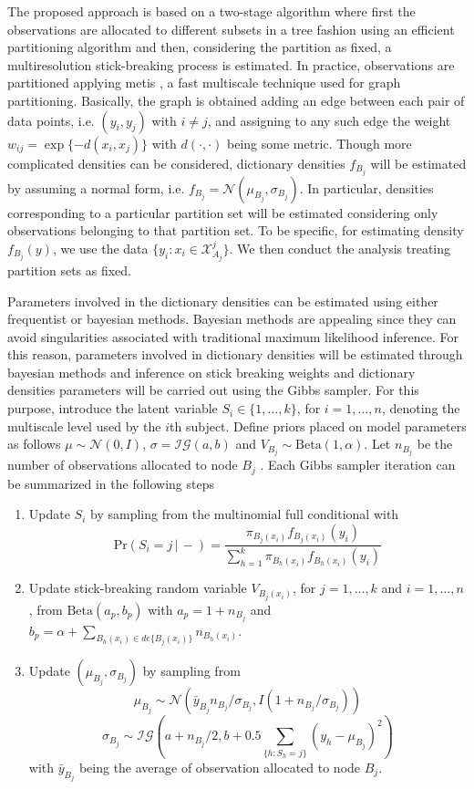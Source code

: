\documentclass{article}
\providecommand{\mc}[1]{\mathcal{#1}}
\begin{document}
The proposed approach is based on a two-stage algorithm where first the observations are allocated to different subsets in a tree fashion using an efficient partitioning algorithm and then, considering the partition as fixed, a multiresolution stick-breaking process is estimated. In practice, observations are partitioned applying metis \cite{metis}, a fast multiscale technique used for graph partitioning. Basically, the graph is obtained adding an edge between each pair of data points, i.e. $(y_i,y_j)$ with $i\not=j$, and assigning to any such edge the weight $w_{ij}=\exp\{-d(x_i,x_j)\}$ with $d(\cdot,\cdot)$ being some metric. Though more complicated densities can be considered, dictionary densities $f_{B_j}$ will be estimated by assuming a normal form, i.e. $f_{B_j}=\mc{N}(\mu_{B_j},\sigma_{B_j})$. In particular, densities corresponding to a particular partition set will be estimated considering only observations belonging to that partition set. To be specific, for estimating density $f_{B_j}(y)$, we use the data $\{ y_i: x_i \in \mathcal{X}^j_{A_j} \}$. We then conduct the analysis treating partition sets as fixed. 

Parameters involved in the dictionary densities can be estimated using either frequentist or bayesian methods. Bayesian methods are appealing since they can avoid singularities associated with traditional maximum likelihood inference. For this reason, parameters involved in dictionary densities will be estimated through bayesian methods and inference on stick breaking weights and dictionary densities parameters will be carried out using the Gibbs sampler. For this purpose, introduce the latent variable $S_i \in \{1,\ldots,k\}$, for $i=1,\ldots,n$, denoting the multiscale level used by the $i$th subject. Define priors placed on model parameters as follows $\mu \sim \mc{N}(0,I)$, $\sigma=\mc{IG}(a,b)$ and $V_{B_j} \sim \mbox{Beta}(1,\alpha)$. Let $n_{B_j}$ be  the number of observations allocated to node $B_j$ . Each Gibbs sampler iteration can be summarized in the following steps
\begin{enumerate}
\item Update $S_i$ by sampling from the multinomial full conditional with 
\[\mbox{Pr}( S_i = j\, |\, -) = \frac{ \pi_{B_j(x_i)}f_{B_j(x_i)}(y_i) }{ \sum_{h=1}^k \pi_{B_h(x_i)}f_{B_h(x_i)}(y_i) } \label{eq:prS}\]
\item Update stick-breaking random variable $V_{B_j(x_i)}$, for $j=1, \ldots, k$ and $i=1, \ldots, n$, from $\mbox{Beta}(a_p,b_p)$ with $a_p=1+n_{B_j}$ and $b_p=\alpha+\sum_{B_h(x_i) \in de\{B_j(x_i)\}} n_{B_h(x_i)}$.
\item Update $(\mu_{B_j},\sigma_{B_j})$ by sampling from
\[  \mu_{B_j} \sim \mc{N}\left(\bar{y}_{B_j} n_{B_j}/\sigma_{B_j},I(1+n_{B_j}/\sigma_{B_j})\right)\]
\[  \sigma_{B_j} \sim \mc{IG}\left(a+n_{B_j}/2,b+0.5\sum_{\{h: S_h=j\}} \left(y_{h}-\mu_{B_j}\right)^2\right)\]
with $\bar{y}_{B_j}$ being the average of observation allocated to node $B_j$.

\end{enumerate}
\end{document}
